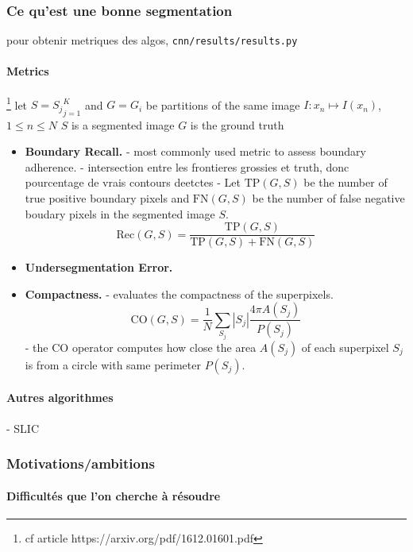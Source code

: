 \documentclass{article}
\begin{document}
        \subsubsection{Ce qu'est une bonne \spp segmentation}
            pour obtenir metriques des algos, \texttt{cnn/results/results.py}
            \paragraph{Metrics}
            \footnote{cf article https://arxiv.org/pdf/1612.01601.pdf}
            let $S = {S_j}^K_{j=1}$ and $G = {G_i}$ be partitions of the same image $I : x_n \mapsto I(x_n)$, $1 \leq n \leq N$
            $S$ is a segmented image
            $G$ is the ground truth
            \begin{itemize}
                \item \textbf{Boundary Recall.}
                - most commonly used metric to assess boundary adherence.
                - intersection entre les frontieres grossies et truth, donc pourcentage de vrais contours deetctes
                - Let $\text{TP}(G,S)$ be the number of true positive boundary pixels and $\text{FN}(G,S)$ be the number of false negative boudary pixels in the segmented image $S$.
                $$\mathrm{Rec}(G,S)=\frac{\mathrm{TP}(G,S)}{\mathrm{TP}(G,S)+\mathrm{FN}(G,S)}$$
                \item \textbf{Undersegmentation Error.}
                \item \textbf{Compactness.}
                - evaluates the compactness of the superpixels.
                $$
                \mathrm{CO}(G, S)=\frac{1}{N} \sum_{S_{j}}|S_{j}| \frac{4 \pi A\left(S_{j}\right)}{P\left(S_{j}\right)}
                $$
                - the $\mathrm{CO}$ operator computes how close the area $A(S_j)$ of each superpixel $S_j$ is from a circle with same perimeter $P(S_j)$.
            \end{itemize}

            \paragraph{Autres algorithmes}
                - SLIC

        \subsubsection{Motivations/ambitions}
                \paragraph{Difficultés que l'on cherche à résoudre}
\end{document}
